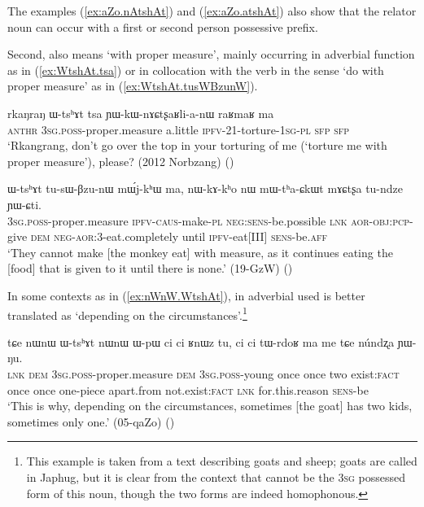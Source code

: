 The examples (\ref{ex:aZo.nAtshAt}) and (\ref{ex:aZo.atshAt}) also show that the relator noun  can occur with a first or second person possessive prefix.

Second,  also means `with proper measure', mainly occurring in adverbial function as in (\ref{ex:WtshAt.tsa}) or in collocation with the verb  in the sense `do with proper measure' as in (\ref{ex:WtshAt.tusWBzunW}). 

\begin{exe}
\ex \label{ex:WtshAt.tsa}
\gll rkaŋraŋ ɯ-tsʰɤt tsa ɲɯ-kɯ-nɤɕtʂaʁli-a-nɯ raʁmaʁ ma  \\
\textsc{anthr} \textsc{3sg}.\textsc{poss}-proper.measure a.little \textsc{ipfv}-2\fl{}1-torture-\textsc{1sg}-\textsc{pl} \textsc{sfp} \textsc{sfp}  \\
\glt `Rkangrang, don't go over the top in your torturing of me (`torture me with proper measure'), please? (2012 Norbzang)
()
\end{exe}

\begin{exe}
\ex \label{ex:WtshAt.tusWBzunW}
\gll ɯ-tsʰɤt tu-sɯ-βzu-nɯ mɯ́j-kʰɯ ma, nɯ-kɤ-kʰo nɯ mɯ-tʰa-ɕkɯt mɤɕtʂa tu-ndze ɲɯ-ɕti. \\
\textsc{3sg}.\textsc{poss}-proper.measure \textsc{ipfv}-\textsc{caus}-make-\textsc{pl} \textsc{neg}:\textsc{sens}-be.possible \textsc{lnk}  \textsc{aor}-\textsc{obj}:\textsc{pcp}-give \textsc{dem} \textsc{neg}-\textsc{aor}:3\flobv{}-eat.completely until \textsc{ipfv}-eat[III] \textsc{sens}-be.\textsc{aff} \\
\glt `They cannot make [the monkey eat] with measure, as it continues eating the [food] that is given to it until there is none.' (19-GzW)
()
\end{exe}

In some contexts as in (\ref{ex:nWnW.WtshAt}),  in adverbial used is better translated as `depending on the circumstances'.\footnote{This example is taken from a text describing goats and sheep; goats are called  in Japhug, but it is clear from the context that  cannot be the \textsc{3sg} possessed form of this noun, though the two forms are indeed homophonous. }

\begin{exe}
\ex \label{ex:nWnW.WtshAt}
\gll tɕe nɯnɯ ɯ-tsʰɤt nɯnɯ ɯ-pɯ ci ci ʁnɯz tu, ci ci tɯ-rdoʁ ma me tɕe núndʐa ɲɯ-ŋu. \\
\textsc{lnk} \textsc{dem} \textsc{3sg}.\textsc{poss}-proper.measure \textsc{dem}  \textsc{3sg}.\textsc{poss}-young once once two exist:\textsc{fact} once once one-piece apart.from not.exist:\textsc{fact} \textsc{lnk} for.this.reason \textsc{sens}-be \\
\glt `This is why, depending on the circumstances, sometimes [the goat] has two kids, sometimes only one.' (05-qaZo)
()
\end{exe}

